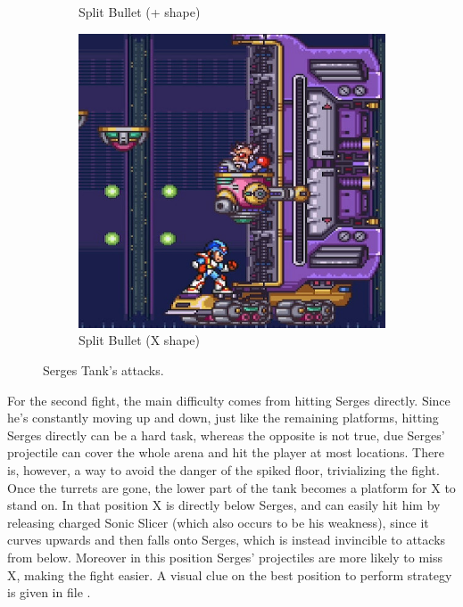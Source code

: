 \begin{figure}[htp]
\begin{subfigure}{.32\linewidth}
		\caption{Split Bullet (+ shape)}
	\end{subfigure}
	\begin{subfigure}{.32\linewidth}
		\centering
		\includegraphics[width=\linewidth]{figures/X2/Hunter_stages/Serges_tank_6.jpg}
		\caption{Split Bullet (X shape)}
	\end{subfigure}
	\caption{Serges Tank's attacks.}	
\end{figure}

For the second fight, the main difficulty comes from hitting Serges directly. Since he's constantly moving up and down, just like the remaining platforms, hitting Serges directly can be a hard task, whereas the opposite is not true, due Serges' projectile  can cover the whole arena and hit the player at most locations. There is, however, a way to avoid the danger of the spiked floor, trivializing the fight. Once the turrets are gone, the lower part of the tank becomes a platform for X to stand on. In that position X is directly below Serges, and can easily hit him by releasing charged Sonic Slicer (which also occurs to be his weakness), since it curves upwards and then falls onto Serges, which is instead invincible to attacks from below. Moreover in this position Serges' projectiles are more likely to miss X, making the fight easier. A visual clue on the best position to perform strategy is given in file .

